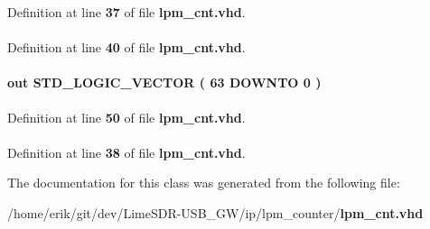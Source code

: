 Definition at line {\bf 37} of file {\bf lpm\+\_\+cnt.\+vhd}.

\paragraph[{lpm}]{\hspace{0.3cm}{\ttfamily [Library]}}\label{classlpm__cnt_ad199d1d41d7313661bf2028e50b8f485}


Definition at line {\bf 40} of file {\bf lpm\+\_\+cnt.\+vhd}.

\paragraph[{q}]{ {\bfseries \textcolor{keywordflow}{out}\textcolor{vhdlchar}{ }} {\bfseries \textcolor{comment}{S\+T\+D\+\_\+\+L\+O\+G\+I\+C\+\_\+\+V\+E\+C\+T\+OR}\textcolor{vhdlchar}{ }\textcolor{vhdlchar}{(}\textcolor{vhdlchar}{ }\textcolor{vhdlchar}{ } \textcolor{vhdldigit}{63} \textcolor{vhdlchar}{ }\textcolor{keywordflow}{D\+O\+W\+N\+TO}\textcolor{vhdlchar}{ }\textcolor{vhdlchar}{ } \textcolor{vhdldigit}{0} \textcolor{vhdlchar}{ }\textcolor{vhdlchar}{)}\textcolor{vhdlchar}{ }} \hspace{0.3cm}{\ttfamily [Port]}}\label{classlpm__cnt_aae9b560b72c6164b8cd12b2c3fc0abcc}


Definition at line {\bf 50} of file {\bf lpm\+\_\+cnt.\+vhd}.

\paragraph[{std\+\_\+logic\+\_\+1164}]{\hspace{0.3cm}{\ttfamily [Package]}}\label{classlpm__cnt_acd03516902501cd1c7296a98e22c6fcb}


Definition at line {\bf 38} of file {\bf lpm\+\_\+cnt.\+vhd}.



The documentation for this class was generated from the following file\+:\begin{DoxyCompactItemize}
\item 
/home/erik/git/dev/\+Lime\+S\+D\+R-\/\+U\+S\+B\+\_\+\+G\+W/ip/lpm\+\_\+counter/{\bf lpm\+\_\+cnt.\+vhd}\end{DoxyCompactItemize}
